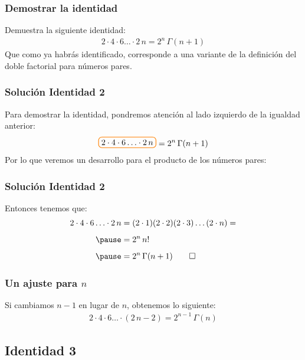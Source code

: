 \documentclass[12pt]{beamer}
\begin{document}
\begin{frame}
\frametitle{Demostrar la identidad}
Demuestra la siguiente identidad:
\pause
\begin{align*}
2 \cdot 4 \cdot 6 \ldots \cdot 2 \, n = 2^{n} \, \Gamma (n + 1)
\end{align*}
\pause
Que como ya habrás identificado, corresponde a una variante de la definición del doble factorial para números pares.
\end{frame}
\begin{frame}[t]
\frametitle{Solución Identidad 2}
Para demostrar la identidad, pondremos atención al lado izquierdo de la igualdad anterior:
\pause
\begin{align*}
\boxedcolor{2 \cdot 4 \cdot 6 \ldots \cdot 2 \, n } = 2^{n} \, \Gamma (n + 1)
\end{align*}
\pause
Por lo que veremos un desarrollo para el producto de los números pares:
\end{frame}
\begin{frame}
\frametitle{Solución Identidad 2}
Entonces tenemos que:
\pause
\begin{eqnarray*}
\begin{aligned}
2 \cdot 4 \cdot 6 \ldots \cdot 2 \, n  &= (2 \cdot 1) (2 \cdot 2) (2 \cdot 3) \ldots (2 \cdot n) = \\[0.5em] \pause
&= 2^{n} \, n! \nonumber \\[0.5em] \pause
&= 2^{n} \, \Gamma (n + 1) \qed 
\end{aligned}
\end{eqnarray*}
\end{frame}
\begin{frame}
\frametitle{Un ajuste para $n$}
Si cambiamos $n - 1$ en lugar de $n$, obtenemos lo siguiente:
\pause
\begin{align*}
2 \cdot 4 \cdot 6 \ldots \cdot (2 \, n - 2)  = 2^{n-1} \, \Gamma (n)
\end{align*}
\end{frame}

\subsection{Identidad 3}
\end{document}

